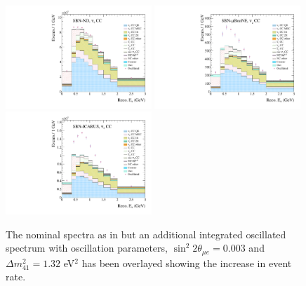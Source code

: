 \begin{figure}[h!]
  {\includegraphics[width=0.49\textwidth]{figures-chap6/spectra/nue_app_dmsq_1.32_sinsq_0.003_overlay_spectrum_sbn_nd_BNB_FHC_0_modes.pdf}}
  {\includegraphics[width=0.49\textwidth]{figures-chap6/spectra/nue_app_dmsq_1.32_sinsq_0.003_overlay_spectrum_sbn_uboone_BNB_FHC_1_modes.pdf}}
  {\includegraphics[width=0.49\textwidth]{figures-chap6/spectra/nue_app_dmsq_1.32_sinsq_0.003_overlay_spectrum_sbn_icarus_BNB_FHC_2_modes.pdf}}
  \captionsetup{width=0.49\textwidth}
  \parbox[b]{0.49\textwidth}%
  {
    \caption[SBN \nue appearance CC inclusive reconstructed neutrino energy spectra with oscillated spectrum overlayed.]{The nominal spectra as in  but an additional integrated oscillated spectrum with oscillation parameters, $\sin^2{2\theta_{\mu e}} = 0.003$ and $\Delta m^2_{41} = 1.32$ eV$^2$ has been overlayed showing the increase in event rate. \\\phantom{.}\\\phantom{.}\\\phantom{.}\\
    \label{fig:nue_spectra_with_osc_overlay}}
    }
\end{figure}

